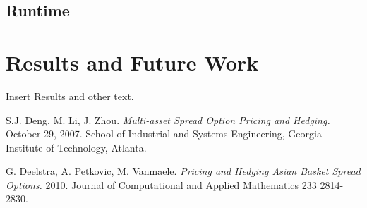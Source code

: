 \documentclass[a4paper]{article}
\begin{document}
\subsection{Runtime}
\label{rt}

\newpage
\section{Results and Future Work}
\label{sec:results}
Insert Results and other text.

\newpage
\begin{thebibliography}{1}
S.J. Deng, M. Li, J. Zhou.
\textit{Multi-asset Spread Option Pricing and Hedging.}
October 29, 2007. School of Industrial and Systems Engineering, Georgia Institute of Technology, Atlanta.

G. Deelstra, A. Petkovic, M. Vanmaele.
\textit{Pricing and Hedging Asian Basket Spread Options.}
2010. Journal of Computational and Applied Mathematics 233 2814-2830.

\end{thebibliography}
\end{document}

